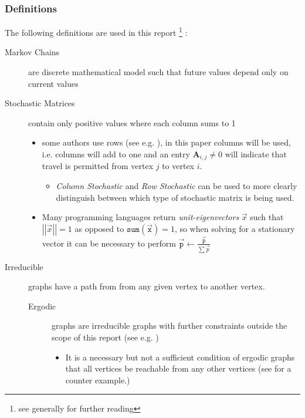 \documentclass[11pt]{article}
\begin{document}
\subsubsection{Definitions}
\label{definitions}
The following definitions are used in this report \footnote{see generally \cite[Ch. 15]{langvilleGooglePageRankScience2012} for further reading} :

\begin{description}
\item[{Markov Chains}] are discrete mathematical model such that future values depend only on current values \cite[]{foussAlgorithmsModelsNetwork2016}
\item[{Stochastic Matrices}] contain only positive values where each column sums to 1 \cite{langvilleGooglePageRankScience2012,larsonElementaryLinearAlgebra1991}
\begin{itemize}
\item some authors use rows (see e.g. \cite[]{langvilleGooglePageRankScience2012}), in this paper columns will be used, i.e. columns will add to one and an entry \(\mathbf{A}_{i,j} \neq 0\) will indicate that travel is permitted from vertex \(j\) to vertex \(i\).
\begin{itemize}
\item \emph{Column Stochastic} and \emph{Row Stochastic} can be used to more clearly distinguish between which type of stochastic matrix is being used.
\end{itemize}
\item Many programming languages return \emph{unit-eigenvectors} \(\vec{x}\) such that \(\left\lvert \left\lvert \vec{x} \right\rvert \right\rvert = 1\) as opposed to \(\mathtt{sum} \left( \vec{\mathtt{x}}\right) = 1\), so when solving for a stationary vector it can be necessary to perform \(\vec{\mathtt{p}} \leftarrow \frac{\vec{\mathtt{p}}}{\sum \vec{p}}\)
\end{itemize}
\item[{Irreducible}] graphs have a path from from any given vertex to another vertex. \cite[]{langvilleGooglePageRankScience2012}
\begin{description}
\item[{Ergodic}] graphs are irreducible graphs with further constraints outside
the scope of this report (see e.g.
\cite{nathanaelackermancameronfreeralexkruckmanandrehanapatelProperlyErodicStructures2017,chenEigenvaluesInequalitiesErgodic2005})
\begin{itemize}
\item It is a necessary but not a sufficient condition of ergodic graphs that all vertices be reachable from any other vertices (see \cite{sazProbabilityTheoryThis} for a counter example.)

\end{itemize}
\end{description}
\end{description}
\end{document}
